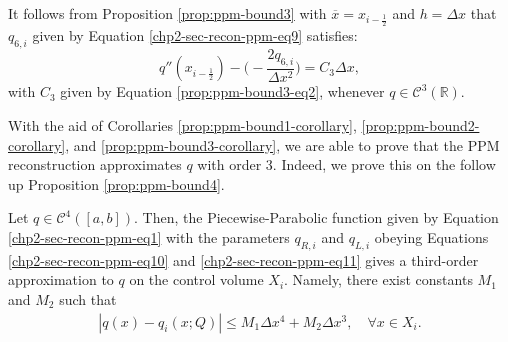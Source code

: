 \begin{corollary}
	\label{prop:ppm-bound3-corollary}
	It follows from Proposition \ref{prop:ppm-bound3} with 
	$\overline{x} = x_{i-\frac{1}{2}}$ and $h = \Delta x$
	that $q_{6,i}$ given by Equation \eqref{chp2-sec-recon-ppm-eq9} satisfies:
	\begin{equation}
		\label{ppm-edges-bound3}
		q''(x_{i-\frac{1}{2}}) -\bigg(-\frac{2q_{6, i}}{\Delta x^2}\bigg) = C_3\Delta x,
	\end{equation}
	with $C_3$ given by Equation \eqref{prop:ppm-bound3-eq2}, whenever $q \in \mathcal{C}^3(\mathbb{R})$.
\end{corollary}
With the aid of Corollaries \ref{prop:ppm-bound1-corollary}, \ref{prop:ppm-bound2-corollary},
and  \ref{prop:ppm-bound3-corollary}, we are able to prove
that the PPM reconstruction approximates $q$ with order 3.
Indeed, we prove this on the follow up Proposition \ref{prop:ppm-bound4}.
\begin{prop}
	\label{prop:ppm-bound4}
	Let $q \in \mathcal{C}^{4}([a,b])$.
	Then, the Piecewise-Parabolic function given by
	Equation \eqref{chp2-sec-recon-ppm-eq1} with 
	the parameters $q_{R,i}$ and $q_{L,i}$ obeying Equations
	\eqref{chp2-sec-recon-ppm-eq10} and \eqref{chp2-sec-recon-ppm-eq11}
	gives a third-order approximation to $q$ on the control volume $X_i$.
	Namely, there exist constants $M_1$ and $M_2$ such that
	\begin{equation*}
		\begin{split}
			|q(x)-q_i(x;Q)| \leq  M_1 \Delta x ^4 + M_2 \Delta x ^3, \quad \forall x \in X_i.
		\end{split}
	\end{equation*}
\end{prop}

